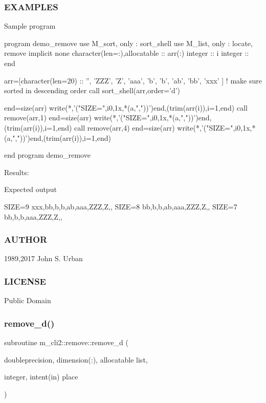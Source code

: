 \subsubsection*{E\+X\+A\+M\+P\+L\+ES}

\begin{DoxyVerb}Sample program

 program demo_remove
 use M_sort, only : sort_shell
 use M_list, only : locate, remove
 implicit none
 character(len=:),allocatable :: arr(:)
 integer                       :: i
 integer                       :: end

 arr=[character(len=20) :: '', 'ZZZ', 'Z', 'aaa', 'b', 'b', 'ab', 'bb', 'xxx' ]
 ! make sure sorted in descending order
 call sort_shell(arr,order='d')

 end=size(arr)
 write(*,'("SIZE=",i0,1x,*(a,","))')end,(trim(arr(i)),i=1,end)
 call remove(arr,1)
 end=size(arr)
 write(*,'("SIZE=",i0,1x,*(a,","))')end,(trim(arr(i)),i=1,end)
 call remove(arr,4)
 end=size(arr)
 write(*,'("SIZE=",i0,1x,*(a,","))')end,(trim(arr(i)),i=1,end)

 end program demo_remove
\end{DoxyVerb}


Results\+:

Expected output

S\+I\+ZE=9 xxx,bb,b,b,ab,aaa,Z\+ZZ,Z,, S\+I\+ZE=8 bb,b,b,ab,aaa,Z\+ZZ,Z,, S\+I\+ZE=7 bb,b,b,aaa,Z\+ZZ,Z,,

\subsubsection*{A\+U\+T\+H\+OR}

1989,2017 John S. Urban \subsubsection*{L\+I\+C\+E\+N\+SE}

Public Domain \mbox{\label{interfacem__cli2_1_1remove_a0d123599053c144f5ab233b735a38f1d}} 
\subsubsection{\texorpdfstring{remove\+\_\+d()}{remove\_d()}}
{\footnotesize\ttfamily subroutine m\+\_\+cli2\+::remove\+::remove\+\_\+d (\begin{DoxyParamCaption}\item[{doubleprecision, dimension(\+:), allocatable}]{list,  }\item[{integer, intent(in)}]{place }\end{DoxyParamCaption})\hspace{0.3cm}{\ttfamily [private]}}

